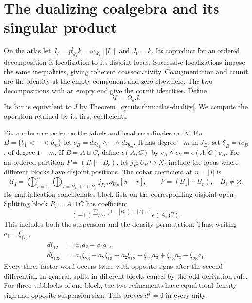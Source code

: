 \section{The dualizing coalgebra and its singular product}
\label{cycuts:sec:dualizing}

On the atlas let $J_I=p_{\mathscr R_I}^!k=\omega_{\mathscr R_I}[|I|]$
and $J_0=k$. Its coproduct for an ordered decomposition is localization
to its disjoint locus. Successive localizations impose the same
inequalities, giving coherent coassociativity. Coaugmentation and
counit are the identity at the empty component and zero elsewhere.
The two decompositions with an empty end give the counit identities.
Define
\[
 \mathscr U=\Omega_\star J.
\]
Its bar is equivalent to $J$ by Theorem~\ref{cycuts:thm:atlas-duality}.
We compute the operation retained by its first coefficients.

Fix a reference order on the labels and local coordinates on $X$.
For $B=\{b_1<\cdots<b_m\}$ let
$c_B=dz_{b_1}\wedge\cdots\wedge dz_{b_m}$. It has degree $-m$
in $J_B$; set $\xi_B=tc_B$, of degree $1-m$. If $B=A\sqcup C$,
define $\epsilon(A,C)$ by $c_A\wedge c_C=\epsilon(A,C)c_B$.
For an ordered partition $P=(B_1|\cdots|B_r)$, let
$j_P:U_P\hookrightarrow\mathscr R_I$ include the locus where different
blocks have disjoint positions. The cobar coefficient at $n=|I|$ is
\begin{equation}\label{cycuts:eq:all-partitions}
 \mathscr U_I=
 \bigoplus_{r=1}^n\ \bigoplus_{I=B_1\sqcup\cdots\sqcup B_r}
              j_{P,*}\omega_{U_P}[n-r],
 \qquad P=(B_1|\cdots|B_r),\quad B_i\ne\varnothing.
\end{equation}
Its multiplication concatenates block lists on the corresponding
disjoint open. Splitting block $B_i=A\sqcup C$ has coefficient
\begin{equation}\label{cycuts:eq:partition-sign}
 (-1)^{\sum_{j<i}(1-|B_j|)+|A|+1}\epsilon(A,C).
\end{equation}
This includes both the suspension and the density permutation.
Thus, writing $a_i=\xi_{\{i\}}$,
\begin{align}
 d\xi_{12}&=a_1a_2-a_2a_1,\label{cycuts:eq:binary-differential}\\
 d\xi_{123}&=a_1\xi_{23}-a_2\xi_{13}+a_3\xi_{12}
             -\xi_{12}a_3+\xi_{13}a_2-\xi_{23}a_1.
             \label{cycuts:eq:ternary-differential}
\end{align}
Every three-factor word occurs twice with opposite signs after the
second differential. In general, splits in different blocks cancel
by the odd derivation rule. For three subblocks of one block, the
two refinements have equal total density sign and opposite suspension
sign. This proves $d^2=0$ in every arity.

